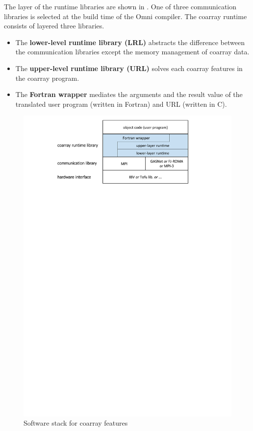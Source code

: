 The layer of the runtime libraries are shown in .
One of three communication libraries is selected 
at the build time of the Omni compiler.
The coarray runtime consists of layered three libraries.
\begin{itemize}
\item
The {\bf lower-level runtime library (LRL)} abstracts the difference between 
the communication libraries except the memory management of coarray data.
\item
The {\bf upper-level runtime library (URL)} solves each coarray features 
in the coarray program.
\item
The {\bf Fortran wrapper} mediates the arguments and the result value 
of the translated user program (written in Fortran) and URL (written in C).
\end{itemize}


\begin{figure}[tbh]
  \begin{center}
    \mbox{\includegraphics[trim=27mm 208mm 29mm 0mm, scale=0.7,clip]{figs/softstack-r4.pdf}}
    \caption{Software stack for coarray features}\label{fig:layer}
  \end{center}
\end{figure}



